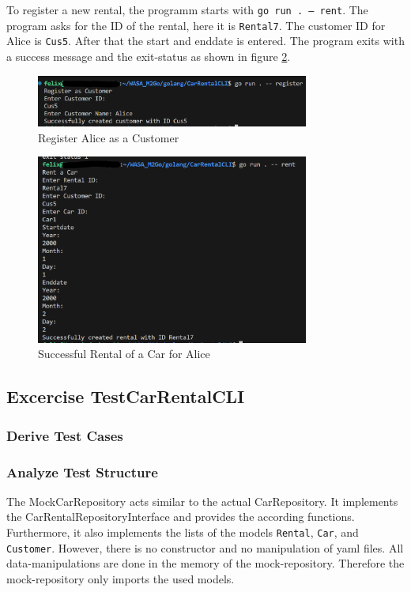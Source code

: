 To register a new rental, the programm starts with \texttt{go run . -- rent}.
The program asks for the ID of the rental, here it is \texttt{Rental7}.
The customer ID for Alice is \texttt{Cus5}.
After that the start and enddate is entered.
The program exits with a success message and the exit-status as shown in figure \ref{fig:car_rental_cli_rental_alice_successful}.

\begin{figure}
      \centering
      \includegraphics[width=0.8\textwidth]{figures/goLang/carRental/carRentalCLI/carRentalCLI_RegisterAlice.png}
      \caption{Register Alice as a Customer}
      \label{fig:car_rental_cli_register_alice}
\end{figure}
\begin{figure}
      \centering
      \includegraphics[width=0.8\textwidth]{figures/goLang/carRental/carRentalCLI/carRentalCLI_SuccessfulRentalAlice.png}
      \caption{Successful Rental of a Car for Alice}
      \label{fig:car_rental_cli_rental_alice_successful}
\end{figure}

\subsection{Excercise TestCarRentalCLI}
\label{sec:exercise_test_car_rental_cli}
\subsubsection*{Derive Test Cases}

\subsubsection*{Analyze Test Structure}
The MockCarRepository acts similar to the actual CarRepository.
It implements the CarRentalRepositoryInterface and provides the according functions.
Furthermore, it also implements the lists of the models \texttt{Rental}, \texttt{Car}, and \texttt{Customer}.
However, there is no constructor and no manipulation of yaml files.
All data-manipulations are done in the memory of the mock-repository.
Therefore the mock-repository only imports the used models.

